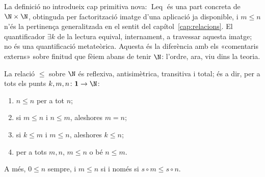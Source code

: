 \begin{observacio}\label{obs:ordre-part}
La definició no introdueix cap primitiva nova: \(\operatorname{Leq}\) és
una part concreta de \(\N\times\N\), obtinguda per factorització imatge
d'una aplicació ja disponible, i \(m\le n\) n'és la pertinença
generalitzada en el sentit del capítol~\ref{cap:relacions}. El
quantificador \(\exists k\) de la lectura equival, internament, a
travessar aquesta imatge; no és una quantificació metateòrica. Aquesta és
la diferència amb els «comentaris externs» sobre finitud que fèiem abans
de tenir \(\N\): l'ordre, ara, viu dins la teoria.
\end{observacio}

\begin{proposicio}\label{prop:ordre-total}
La relació \(\le\) sobre \(\N\) és reflexiva, antisimètrica, transitiva i
total; és a dir, per a tots els punts \(k,m,n\colon\mathbf1\to\N\):
\begin{enumerate}
\item \(n\le n\) per a tot \(n\);
\item si \(m\le n\) i \(n\le m\), aleshores \(m=n\);
\item si \(k\le m\) i \(m\le n\), aleshores \(k\le n\);
\item per a tots \(m,n\), \(m\le n\) o bé \(n\le m\).
\end{enumerate}
A més, \(0\le n\) sempre, i \(m\le n\) si i només si \(s\circ m\le s\circ
n\).
\end{proposicio}

